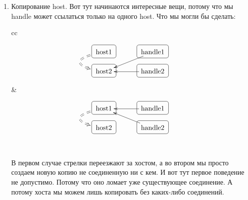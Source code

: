 \begin{enumerate}
\item Копирование host.
Вот тут начинаются интересные вещи, потому что мы handle может ссылаться только на одного host.
Что мы могли бы сделать:
\begin{center}
\begin{tabular}{cc}
{
\begin{minipage}[\baselineskip]{5.5cm}
\[
\xymatrix@R=15pt@C=15pt{
  {\text{host1}}\ar@{==>}@/_30pt/[d]<-5pt>
      	{
	\save
   [].[]*+[F-:<3pt>]\frm{}
   \restore
	}
  &{}&{\text{handle1}}\ar[lld]
    	{
	\save
   [].[]*+[F-:<3pt>]\frm{}
   \restore
	}
  \\
  {\text{host2}}
        	{
	\save
   [].[]*+[F-:<3pt>]\frm{}
   \restore
	}
  &{}&{\text{handle2}}\ar[ll]
    	{
	\save
   [].[]*+[F-:<3pt>]\frm{}
   \restore
	}
  \\ 
}
\]
\end{minipage}
}&{
\begin{minipage}[\baselineskip]{5.5cm}
\[
\xymatrix@R=15pt@C=15pt{
  {\text{host1}}\ar@{==>}@/_30pt/[d]<-5pt>
      	{
	\save
   [].[]*+[F-:<3pt>]\frm{}
   \restore
	}
  &{}&{\text{handle1}}\ar[ll]
    	{
	\save
   [].[]*+[F-:<3pt>]\frm{}
   \restore
	}
  \\ 
  {\text{host2}}
        	{
	\save
   [].[]*+[F-:<3pt>]\frm{}
   \restore
	}
  &{}&{\text{handle2}}\ar[llu]
    	{
	\save
   [].[]*+[F-:<3pt>]\frm{}
   \restore
	}
  \\ 
}
\]
\end{minipage}
}\\
\end{tabular}
\end{center}
В первом случае стрелки переезжают за хостом, а во втором мы просто создаем новую копию не соединенную ни с кем.
И вот тут первое поведение не допустимо.
Потому что оно ломает уже существующее соединение.
А потому хоста мы можем лишь копировать без каких-либо соединений.


\end{enumerate}
